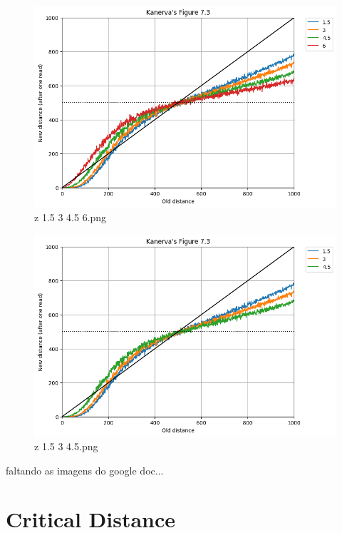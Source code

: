 \documentclass[11pt]{article} %
\begin{document}
\begin{figure}
  \includegraphics[width=\linewidth]{./images02/new-images/z_15_3_45_6.png}
  \caption{z 1.5 3 4.5 6.png}
  \label{fig:boat1}
\end{figure}



\begin{figure}
  \includegraphics[width=\linewidth]{./images02/new-images/z_15_3_45.png}
  \caption{z 1.5 3 4.5.png}
  \label{fig:boat1}
\end{figure}


faltando as imagens do google doc...
\section{Critical Distance}
\end{document}
